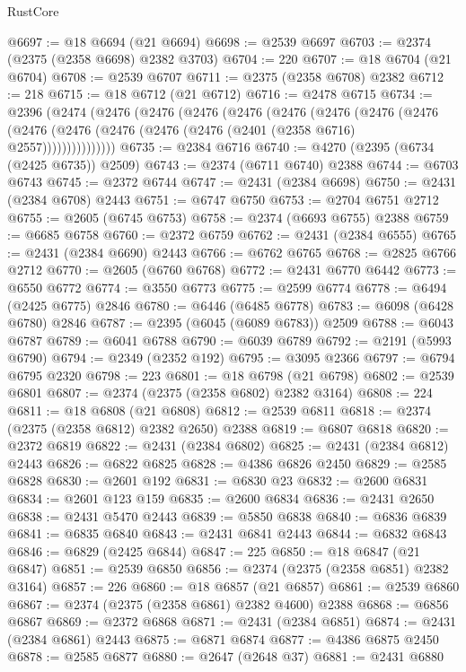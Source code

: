 \begin{lexlean}{RustCore}
\begin{coremodule}
@6697 := @18 @6694 (@21 @6694)
@6698 := @2539 @6697
@6703 := @2374 (@2375 (@2358 @6698) @2382 @3703)
@6704 := 220
@6707 := @18 @6704 (@21 @6704)
@6708 := @2539 @6707
@6711 := @2375 (@2358 @6708) @2382
@6712 := 218
@6715 := @18 @6712 (@21 @6712)
@6716 := @2478 @6715
@6734 := @2396
    (@2474
      (@2476
        (@2476
          (@2476
            (@2476
              (@2476
                (@2476
                  (@2476
                    (@2476
                      (@2476 (@2476 (@2476 (@2476 (@2476 (@2401 (@2358 @6716) @2557)))))))))))))))
@6735 := @2384 @6716
@6740 := @4270 (@2395 (@6734 (@2425 @6735)) @2509)
@6743 := @2374 (@6711 @6740) @2388
@6744 := @6703 @6743
@6745 := @2372 @6744
@6747 := @2431 (@2384 @6698)
@6750 := @2431 (@2384 @6708) @2443
@6751 := @6747 @6750
@6753 := @2704 @6751 @2712
@6755 := @2605 (@6745 @6753)
@6758 := @2374 (@6693 @6755) @2388
@6759 := @6685 @6758
@6760 := @2372 @6759
@6762 := @2431 (@2384 @6555)
@6765 := @2431 (@2384 @6690) @2443
@6766 := @6762 @6765
@6768 := @2825 @6766 @2712
@6770 := @2605 (@6760 @6768)
@6772 := @2431 @6770 @6442
@6773 := @6550 @6772
@6774 := @3550 @6773
@6775 := @2599 @6774
@6778 := @6494 (@2425 @6775) @2846
@6780 := @6446 (@6485 @6778)
@6783 := @6098 (@6428 @6780) @2846
@6787 := @2395 (@6045 (@6089 @6783)) @2509
@6788 := @6043 @6787
@6789 := @6041 @6788
@6790 := @6039 @6789
@6792 := @2191 (@5993 @6790)
@6794 := @2349 (@2352 @192)
@6795 := @3095 @2366
@6797 := @6794 @6795 @2320
@6798 := 223
@6801 := @18 @6798 (@21 @6798)
@6802 := @2539 @6801
@6807 := @2374 (@2375 (@2358 @6802) @2382 @3164)
@6808 := 224
@6811 := @18 @6808 (@21 @6808)
@6812 := @2539 @6811
@6818 := @2374 (@2375 (@2358 @6812) @2382 @2650) @2388
@6819 := @6807 @6818
@6820 := @2372 @6819
@6822 := @2431 (@2384 @6802)
@6825 := @2431 (@2384 @6812) @2443
@6826 := @6822 @6825
@6828 := @4386 @6826 @2450
@6829 := @2585 @6828
@6830 := @2601 @192
@6831 := @6830 @23
@6832 := @2600 @6831
@6834 := @2601 @123 @159
@6835 := @2600 @6834
@6836 := @2431 @2650
@6838 := @2431 @5470 @2443
@6839 := @5850 @6838
@6840 := @6836 @6839
@6841 := @6835 @6840
@6843 := @2431 @6841 @2443
@6844 := @6832 @6843
@6846 := @6829 (@2425 @6844)
@6847 := 225
@6850 := @18 @6847 (@21 @6847)
@6851 := @2539 @6850
@6856 := @2374 (@2375 (@2358 @6851) @2382 @3164)
@6857 := 226
@6860 := @18 @6857 (@21 @6857)
@6861 := @2539 @6860
@6867 := @2374 (@2375 (@2358 @6861) @2382 @4600) @2388
@6868 := @6856 @6867
@6869 := @2372 @6868
@6871 := @2431 (@2384 @6851)
@6874 := @2431 (@2384 @6861) @2443
@6875 := @6871 @6874
@6877 := @4386 @6875 @2450
@6878 := @2585 @6877
@6880 := @2647 (@2648 @37)
@6881 := @2431 @6880

\end{coremodule}
\end{lexlean}
